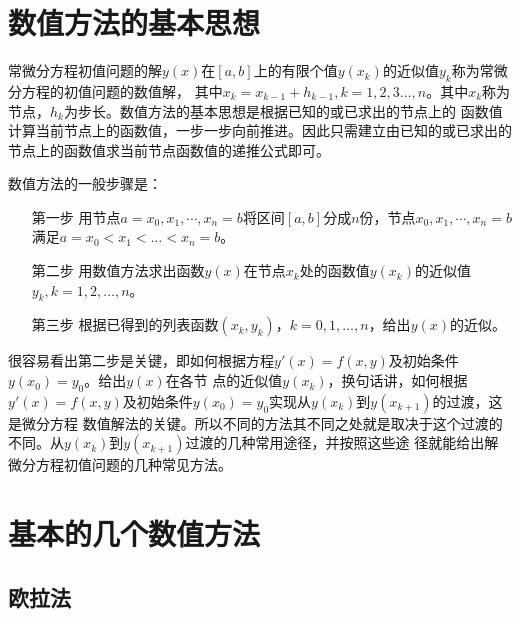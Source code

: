 \documentclass[a4paper,12pt]{article}
\begin{document}
\section{数值方法的基本思想}
常微分方程初值问题的解$y(x)$在$[a,b]$上的有限个值$y(x_k)$的近似值$y_k$称为常微分方程的初值问题的数值解，
其中$x_k=x_{k-1}+h_{k-1},k=1,2,3\ldots,n$。其中$x_k$称为节点，$h_k$为步长。数值方法的基本思想是根据已知的或已求出的节点上的
函数值计算当前节点上的函数值，一步一步向前推进。因此只需建立由已知的或已求出的节点上的函数值求当前节点函数值的递推公式即可。\par
数值方法的一般步骤是：
\begin{itemize}
\item [第一步] 用节点$a=x_0,x_1,\cdots,x_n=b$将区间$[a,b]$分成$n$份，节点$x_0,x_1,\cdots,x_n=b$满足$a=x_0<x_1<\ldots<x_n=b$。
\item [第二步] 用数值方法求出函数$y(x)$在节点$x_k$处的函数值$y(x_k)$的近似值$y_k,k=1,2,\ldots,n$。
\item [第三步] 根据已得到的列表函数$(x_k,y_k)$，$k=0,1,\ldots,n$，给出$y(x)$的近似。
\end{itemize}

很容易看出第二步是关键，即如何根据方程$y'(x)=f(x,y)$及初始条件$y(x_0)=y_0$。给出$y(x)$在各节
点的近似值$y(x_k)$，换句话讲，如何根据$y'(x)=f(x,y)$及初始条件$y(x_0)=y_0$实现从$y(x_k)$到$y(x_{k+1})$的过渡，这是微分方程
数值解法的关键。所以不同的方法其不同之处就是取决于这个过渡的不同。从$y(x_k)$到$y(x_{k+1})$过渡的几种常用途径，并按照这些途
径就能给出解微分方程初值问题的几种常见方法。

\section{基本的几个数值方法}
\subsection{欧拉法}
\end{document}
